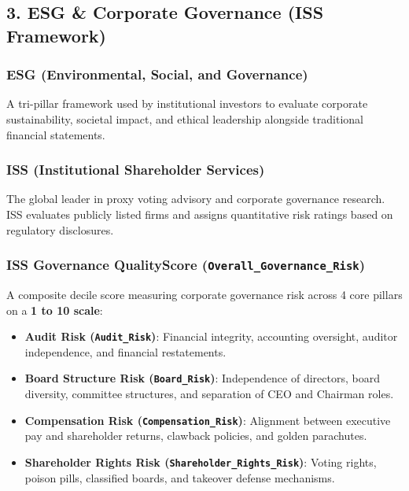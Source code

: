 \documentclass[
]{article}
\providecommand{\tightlist}{%
  \setlength{\itemsep}{0pt}\setlength{\parskip}{0pt}}
\begin{document}
\subsection{3. ESG \& Corporate Governance (ISS
Framework)}\label{esg-corporate-governance-iss-framework}

\subsubsection{ESG (Environmental, Social, and
Governance)}\label{esg-environmental-social-and-governance}

A tri-pillar framework used by institutional investors to evaluate
corporate sustainability, societal impact, and ethical leadership
alongside traditional financial statements.

\subsubsection{ISS (Institutional Shareholder
Services)}\label{iss-institutional-shareholder-services}

The global leader in proxy voting advisory and corporate governance
research. ISS evaluates publicly listed firms and assigns quantitative
risk ratings based on regulatory disclosures.

\subsubsection{\texorpdfstring{ISS Governance QualityScore
(\texttt{Overall\_Governance\_Risk})}{ISS Governance QualityScore (Overall\_Governance\_Risk)}}\label{iss-governance-qualityscore-overall_governance_risk}

A composite decile score measuring corporate governance risk across 4
core pillars on a \textbf{1 to 10 scale}:

\begin{itemize}
\tightlist
\item
  \textbf{Audit Risk (\texttt{Audit\_Risk})}: Financial integrity,
  accounting oversight, auditor independence, and financial
  restatements.
\item
  \textbf{Board Structure Risk (\texttt{Board\_Risk})}: Independence of
  directors, board diversity, committee structures, and separation of
  CEO and Chairman roles.
\item
  \textbf{Compensation Risk (\texttt{Compensation\_Risk})}: Alignment
  between executive pay and shareholder returns, clawback policies, and
  golden parachutes.
\item
  \textbf{Shareholder Rights Risk (\texttt{Shareholder\_Rights\_Risk})}:
  Voting rights, poison pills, classified boards, and takeover defense
  mechanisms.
\end{itemize}
\end{document}
